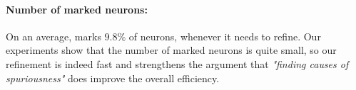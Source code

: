 \paragraph{Number of marked neurons: }
On an average, \drefine{} marks $9.8\%$ of neurons, whenever it needs to refine. 
Our experiments show that the number of marked neurons is quite small, so our refinement is indeed fast and strengthens the argument that {\em "finding causes of spuriousness"} does improve the overall efficiency. 









